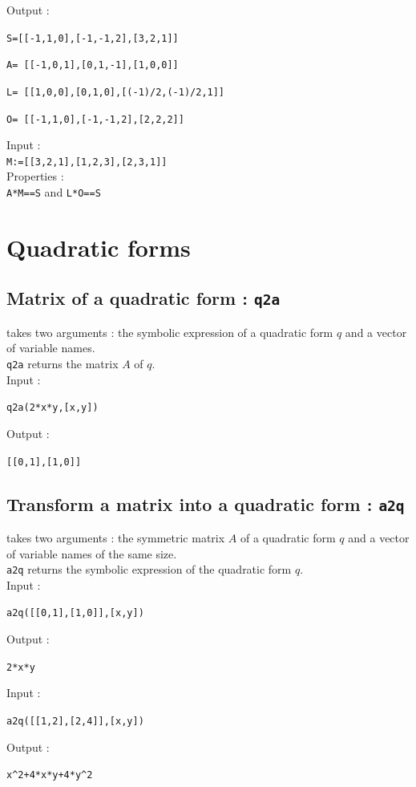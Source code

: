 \documentclass[a4paper,11pt]{book}
\begin{document}
Output :
\begin{center}{\tt S=[[-1,1,0],[-1,-1,2],[3,2,1]] }\end{center}
\begin{center}{\tt A= [[-1,0,1],[0,1,-1],[1,0,0]]}\end{center}
\begin{center}{\tt L= [[1,0,0],[0,1,0],[(-1)/2,(-1)/2,1]]}\end{center}
\begin{center}{\tt O= [[-1,1,0],[-1,-1,2],[2,2,2]]}\end{center}
Input :\\
{\tt M:=[[3,2,1],[1,2,3],[2,3,1]]}\\
Properties :\\
{\tt A*M==S} and {\tt L*O==S}

\section{Quadratic forms}
\subsection{Matrix of a quadratic form : {\tt q2a}} 
 takes two arguments : the symbolic expression
of a quadratic form $q$ and a
vector of variable names.\\ 
{\tt q2a} returns the matrix $A$ of $q$.\\ 
Input :
\begin{center}{\tt q2a(2*x*y,[x,y])}\end{center}
Output :
\begin{center}{\tt  [[0,1],[1,0]]}\end{center}

\subsection{Transform a matrix into a quadratic form : {\tt a2q}}
 takes two arguments : the symmetric matrix $A$ 
of a quadratic 
form $q$ and a vector of variable names of the same size.\\
{\tt a2q} returns the symbolic expression of the quadratic form $q$.\\   
Input :
\begin{center}{\tt a2q([[0,1],[1,0]],[x,y])}\end{center}
Output :
\begin{center}{\tt 2*x*y}\end{center}
Input :
\begin{center}{\tt a2q([[1,2],[2,4]],[x,y]) }\end{center}
Output :
\begin{center}{\tt x\verb|^|2+4*x*y+4*y\verb|^|2}\end{center}
\end{document}
